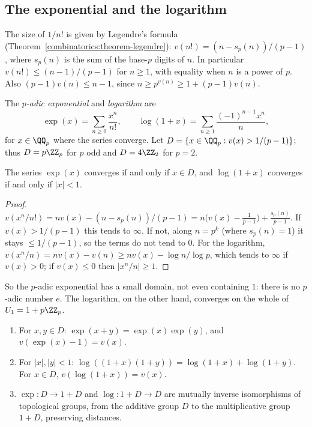 \subsection{The exponential and the logarithm}\label{p-adic-numbers:subsection-exp-log}

The size of $1/n!$ is given by Legendre's formula (Theorem~\ref{combinatorics:theorem-legendre}): $v(n!) = (n - s_p(n))/(p - 1)$, where $s_p(n)$ is the sum of the base-$p$ digits of $n$. In
particular $v(n!) \leq (n - 1)/(p - 1)$ for $n \geq 1$, with equality when $n$ is a power of $p$. Also $(p - 1)v(n) \leq n - 1$, since $n \geq p^{v(n)} \geq 1 + (p - 1)v(n)$.

\begin{definition}\label{p-adic-numbers:definition-exp-log}
The \emph{$p$-adic exponential} and \emph{logarithm} are
\[
\exp(x) = \sum_{n \geq 0}\frac{x^n}{n!}, \qquad \log(1 + x) = \sum_{n \geq 1}\frac{(-1)^{n-1}x^n}{n},
\]
for $x \in \QQ_p$ where the series converge. Let $D = \{x \in \QQ_p : v(x) > 1/(p - 1)\}$; thus $D = p\ZZ_p$ for $p$ odd and $D = 4\ZZ_2$ for $p = 2$.
\end{definition}

\begin{proposition}\label{p-adic-numbers:proposition-exp-log-convergence}
The series $\exp(x)$ converges if and only if $x \in D$, and $\log(1 + x)$ converges if and only if $|x| < 1$.
\end{proposition}

\begin{proof}
$v(x^n/n!) = nv(x) - (n - s_p(n))/(p - 1) = n\bigl(v(x) - \frac{1}{p - 1}\bigr) + \frac{s_p(n)}{p - 1}$. If $v(x) > 1/(p - 1)$ this tends to $\infty$. If not, along $n = p^k$ (where $s_p(n) = 1$) it stays
$\leq 1/(p - 1)$, so the terms do not tend to $0$. For the logarithm, $v(x^n/n) = nv(x) - v(n) \geq nv(x) - \log n/\log p$, which tends to $\infty$ if $v(x) > 0$; if $v(x) \leq 0$ then $|x^n/n| \geq 1$.
\end{proof}

So the $p$-adic exponential has a small domain, not even containing $1$: there is no $p$-adic number $e$. The logarithm, on the other hand, converges on the whole of $U_1 = 1 + p\ZZ_p$.

\begin{theorem}\label{p-adic-numbers:theorem-exp-log}
\begin{enumerate}
\item For $x, y \in D$: $\exp(x + y) = \exp(x)\exp(y)$, and $v(\exp(x) - 1) = v(x)$.
\item For $|x|, |y| < 1$: $\log((1 + x)(1 + y)) = \log(1 + x) + \log(1 + y)$. For $x \in D$, $v(\log(1 + x)) = v(x)$.
\item $\exp \colon D \to 1 + D$ and $\log \colon 1 + D \to D$ are mutually inverse isomorphisms of topological groups, from the additive group $D$ to the multiplicative group $1 + D$, preserving
distances.
\end{enumerate}
\end{theorem}

